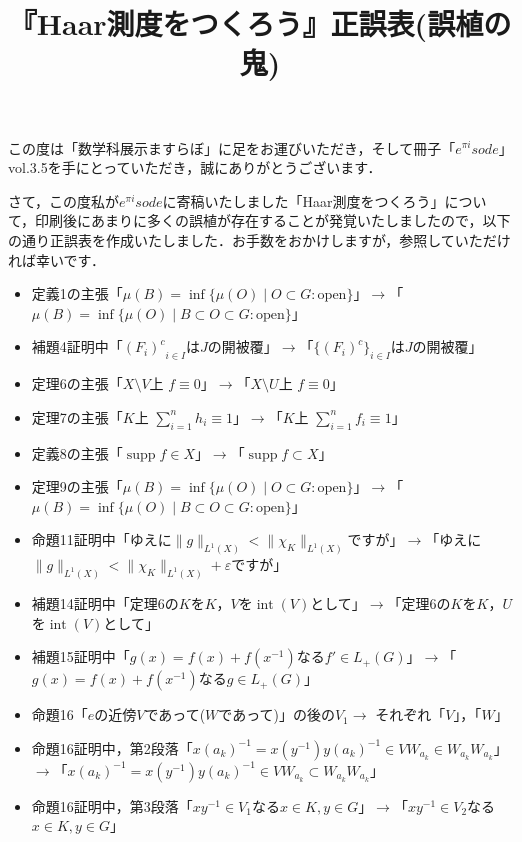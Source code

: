 \documentclass[b5paper,dvipdfmx]{jsarticle}
\title{『Haar測度をつくろう』正誤表(誤植の鬼)}
\date{}
\DeclareMathOperator{\supp}{supp}
\DeclareMathOperator{\inter}{int}
\begin{document}
\maketitle

この度は「数学科展示ますらぼ」に足をお運びいただき，そして冊子「$e^{\pi i}sode$」vol.3.5を手にとっていただき，誠にありがとうございます．

さて，この度私が$e^{\pi i}sode$に寄稿いたしました「Haar測度をつくろう」について，印刷後にあまりに多くの誤植が存在することが発覚いたしましたので，以下の通り正誤表を作成いたしました．お手数をおかけしますが，参照していただければ幸いです．

\begin{itemize}
\item 定義1の主張「$\mu(B)=\inf \{ \mu(O) \mid O \subset G : \mathrm{open} \}$」$\rightarrow$「$\mu(B)=\inf \{ \mu(O) \mid B \subset O \subset G : \mathrm{open} \}$」
\item 補題4証明中「${(F_i)^{c}}_{i \in I}$は$J$の開被覆」$\rightarrow$「$\{ (F_i)^{c} \}_{i \in I}$は$J$の開被覆」
\item 定理6の主張「$X \setminus V$上 $f \equiv 0$」$\rightarrow$「$X \setminus U$上 $f \equiv 0$」
\item 定理7の主張「$K$上 $\sum_{i=1}^{n}h_i \equiv 1$」$\rightarrow$「$K$上 $\sum_{i=1}^{n}f_i \equiv 1$」
\item 定義8の主張「$\supp f \in X$」$\rightarrow$「$\supp f \subset X$」
\item 定理9の主張「$\mu(B)=\inf \{ \mu(O) \mid O \subset G : \mathrm{open} \}$」$\rightarrow$「$\mu(B)=\inf \{ \mu(O) \mid B \subset O \subset G : \mathrm{open} \}$」
\item 命題11証明中「ゆえに$\| g\|  _{L^1(X)} < \| \chi_{K} \| _{L^1(X)} $ですが」$\rightarrow$「ゆえに$\| g\|  _{L^1(X)} < \| \chi_{K} \| _{L^1(X)} +\varepsilon $ですが」
\item 補題14証明中「定理6の$K$を$K$，$V$を$\inter(V)$として」$\rightarrow$「定理6の$K$を$K$，$U$を$\inter(V)$として」
\item 補題15証明中「$g(x)=f(x)+f(x^{-1})$なる$f' \in L_{+}(G)$」$\rightarrow$「$g(x)=f(x)+f(x^{-1})$なる$g \in L_{+}(G)$」
\item 命題16「$e$の近傍$V$であって($W$であって)」の後の$V_1 \rightarrow$ それぞれ「$V$」，「$W$」
\item 命題16証明中，第2段落「$x(a_k)^{-1}=x(y^{-1})y(a_k)^{-1} \in VW_{a_k} \in W_{a_k}W_{a_k}$」$\rightarrow$「$x(a_k)^{-1}=x(y^{-1})y(a_k)^{-1} \in VW_{a_k} \subset W_{a_k}W_{a_k}$」
\item 命題16証明中，第3段落「$xy^{-1} \in V_1$なる$x \in K, y \in G$」$\rightarrow$「$xy^{-1} \in V_2$なる$x \in K, y \in G$」

\end{itemize}
\end{document}
